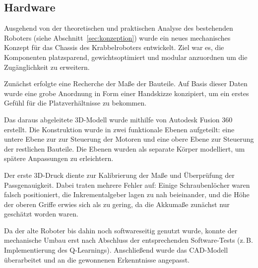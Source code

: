 \subsection{Hardware}

Ausgehend von der theoretischen und praktischen Analyse des bestehenden Roboters (siehe Abschnitt~\ref{sec:konzeption}) wurde ein neues mechanisches Konzept für das Chassis des Krabbelroboters 
entwickelt. Ziel war es, die Komponenten platzsparend, gewichtsoptimiert und modular anzuordnen um die Zugänglichkeit zu erweitern.

Zunächst erfolgte eine Recherche der Maße der Bauteile. Auf Basis dieser Daten wurde eine grobe Anordnung in Form einer Handskizze konzipiert, um ein erstes Gefühl für die Platzverhältnisse zu bekommen.

Das daraus abgeleitete 3D-Modell wurde mithilfe von Autodesk Fusion 360 erstellt. Die Konstruktion wurde in zwei funktionale Ebenen aufgeteilt: 
eine untere Ebene zur zur Steuerung der Motoren und eine obere Ebene zur Steuerung der restlichen Bauteile. 
Die Ebenen wurden als separate Körper modelliert, um spätere Anpassungen zu erleichtern.

Der erste 3D-Druck diente zur Kalibrierung der Maße und Überprüfung der Passgenauigkeit. Dabei traten mehrere Fehler auf: 
Einige Schraubenlöcher waren falsch positioniert, die Inkrementalgeber lagen zu nah beieinander, und die Höhe der oberen Griffe erwies sich als zu gering, 
da die Akkumaße zunächst nur geschätzt worden waren.

Da der alte Roboter bis dahin noch softwareseitig genutzt wurde, konnte der mechanische Umbau erst nach Abschluss der entsprechenden Software-Tests (z.\,B. Implementierung des Q-Learnings). 
Anschließend wurde das CAD-Modell überarbeitet und an die gewonnenen Erkenntnisse angepasst.

